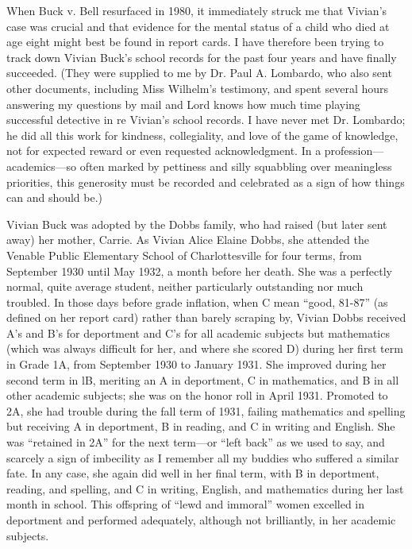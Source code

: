\documentclass[12pt]{letter}
\begin{document}
When Buck v. Bell resurfaced in 1980, it immediately struck me that Vivian’s case was
crucial and that evidence for the mental status of a child who died at age eight might best
be found in report cards. I have therefore been trying to track down Vivian Buck’s school
records for the past four years and have finally succeeded. (They were supplied to me by
Dr. Paul A. Lombardo, who also sent other documents, including Miss Wilhelm’s
testimony, and spent several hours answering my questions by mail and Lord knows how
much time playing successful detective in re Vivian’s school records. I have never met
Dr. Lombardo; he did all this work for kindness, collegiality, and love of the game of
knowledge, not for expected reward or even requested acknowledgment. In a
profession—academics—so often marked by pettiness and silly squabbling over
meaningless priorities, this generosity must be recorded and celebrated as a sign of how
things can and should be.)

Vivian Buck was adopted by the Dobbs family, who had raised (but later sent away) her
mother, Carrie. As Vivian Alice Elaine Dobbs, she attended the Venable Public
Elementary School of Charlottesville for four terms, from September 1930 until May
1932, a month before her death. She was a perfectly normal, quite average student,
neither particularly outstanding nor much troubled. In those days before grade inflation,
when C mean “good, 81-87” (as defined on her report card) rather than barely scraping
by, Vivian Dobbs received A’s and B’s for deportment and C’s for all academic subjects
but mathematics (which was always difficult for her, and where she scored D) during her
first term in Grade 1A, from September 1930 to January 1931. She improved during her
second term in lB, meriting an A in deportment, C in mathematics, and B in all other
academic subjects; she was on the honor roll in April 1931. Promoted to 2A, she had
trouble during the fall term of 1931, failing mathematics and spelling but receiving A in
deportment, B in reading, and C in writing and English. She was “retained in 2A” for the
next term—or “left back” as we used to say, and scarcely a sign of imbecility as I
remember all my buddies who suffered a similar fate. In any case, she again did well in
her final term, with B in deportment, reading, and spelling, and C in writing, English, and
mathematics during her last month in school. This offspring of “lewd and immoral”
women excelled in deportment and performed adequately, although not brilliantly, in her
academic subjects.
\end{document}
